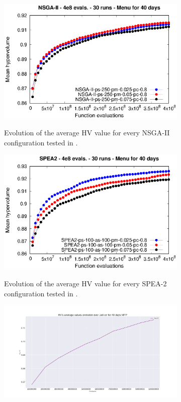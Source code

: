 \begin{figure}[H]
\begin{subfigure}{.5\textwidth}
  \centering
  \includegraphics[width=1.0\linewidth]{../references/meanHV_Evolution_NSGA2_days_40.eps}
  \label{fig:sfig1}
    \caption{Evolution of the average HV value for every NSGA-II configuration tested in \cite{Miranda2018}.}
\end{subfigure}%
\begin{subfigure}{.5\textwidth}
  \centering
  \includegraphics[width=1.0\linewidth]{../references/meanHV_Evolution_SPEA2_days_40.eps}
  \label{fig:sfig2}
  \caption{Evolution of the average HV value for every SPEA-2 configuration tested in \cite{Miranda2018}.}
\end{subfigure}
\centering
\begin{subfigure}{.9\textwidth}
  \centering
  \includegraphics[width=1.0\linewidth]{../experiments/plots/avgHV_evolution_40_days.png}

\end{subfigure}
\end{figure}
